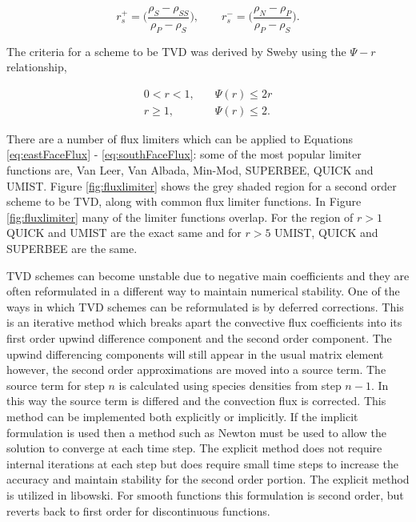 \begin{equation}
    r_{s}^{+} = \bigg( \frac{\rho_{S} - \rho_{SS}}{\rho_{P} - \rho_{S}}\bigg), \quad \quad r_{s}^{-} = \bigg(\frac{\rho_{N} - \rho_{P}}{\rho_{P} - \rho_{S}} \bigg).
\end{equation}

The criteria for a scheme to be TVD was derived by Sweby \cite{sweby1984} using the $\Psi - r$ relationship,

\begin{equation}
\begin{split}
    0 < r < 1, &\quad \Psi(r) \leq 2r \\
    r \geq 1, &\quad  \Psi (r) \leq 2.
\end{split}
\end{equation}

\noindent There are a number of flux limiters which can be applied to Equations \ref{eq:eastFaceFlux} - \ref{eq:southFaceFlux}: some of the most popular limiter functions are, Van Leer, Van Albada, Min-Mod, SUPERBEE, QUICK and UMIST. Figure \ref{fig:fluxlimiter} shows the grey shaded region for a second order scheme to be TVD, along with common flux limiter functions. In Figure \ref{fig:fluxlimiter} many of the limiter functions overlap. For the region of $r > 1$ QUICK and UMIST are the exact same and for $r > 5$ UMIST, QUICK and SUPERBEE are the same. 




TVD schemes can become unstable due to negative main coefficients and they are often reformulated in a different way to maintain numerical stability. One of the ways in which TVD schemes can be reformulated is by deferred corrections. This is an iterative method which breaks apart the convective flux coefficients into its first order upwind difference component and the second order component. The upwind differencing components will still appear in the usual matrix element however, the second order approximations are moved into a source term. The source term for step $n$ is calculated using species densities from step $n-1$. In this way the source term is differed and the convection flux is corrected. This method can be implemented both explicitly or implicitly. If the implicit formulation is used then a method such as Newton must be used to allow the solution to converge at each time step. The explicit method does not require internal iterations at each step but does require small time steps to increase the accuracy and maintain stability for the second order portion. The explicit method is utilized in libowski. For smooth functions this formulation is second order, but reverts back to first order for discontinuous functions.  

